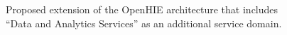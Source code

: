\documentclass[
  authoryear]{elsarticle}
\begin{document}
\begin{figure}


\caption{\label{fig-ohie}Proposed extension of the OpenHIE architecture
that includes ``Data and Analytics Services'' as an additional service
domain.}

\end{figure}%
\end{document}

